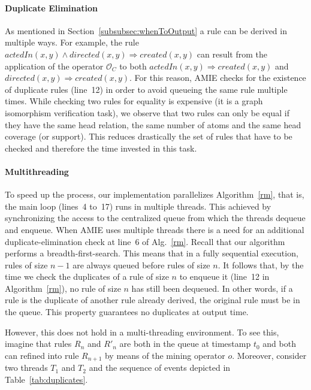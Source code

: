 \paragraph{Duplicate Elimination}
As mentioned in Section~\ref{subsubsec:whenToOutput} a rule can be derived in multiple ways.
For example, the rule $actedIn(x,y) \wedge directed(x,y) \Rightarrow created(x,y)$ can result from the application
of the operator $\mathcal{O}_C$ to both $actedIn(x,y) \Rightarrow created(x,y)$ and $directed(x,y) \Rightarrow created(x,y)$.
For this reason, AMIE checks for the existence of duplicate rules (line~12) in order to avoid queueing the same rule multiple times.
While checking two rules for equality is expensive (it is a graph isomorphism verification task), 
we observe that two rules can only be equal if they have the same head relation, the same number of atoms and
the same head coverage (or support). This reduces drastically the set of rules that have to be checked and therefore
the time invested in this task.


\paragraph{Multithreading}
To speed up the process, our implementation parallelizes Algorithm~\ref{rm}, that is, the main loop (lines~4 to~17) runs in multiple threads. 
This achieved by synchronizing the access to the centralized queue from which the threads dequeue and enqueue.
When AMIE uses multiple threads there is a need for an additional duplicate-elimination check at line~6 of Alg.~\ref{rm}.
Recall that our algorithm performs a breadth-first-search. 
This means that in a fully sequential execution, rules of size $n-1$ are always queued before rules of size $n$. 
It follows that, by the time we check the duplicates of a rule of size $n$ to enqueue it (line~12 in Algorithm~\ref{rm}), 
no rule of size $n$ has still been dequeued. In other words, if a rule is the duplicate 
of another rule already derived, the original rule must be in the queue. This property guarantees no duplicates at output time. 

However, this does not hold in a multi-threading environment. 
To see this, imagine that rules 
$R_n$ and $R'_n$ are both in the queue at timestamp $t_0$ and both can refined into rule $R_{n+1}$
by means of the mining operator $o$. 
Moreover, consider two threads $T_1$ and $T_2$ and the sequence of events depicted in Table~\ref{tab:duplicates}.

